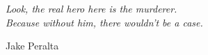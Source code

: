 
\null\vskip5cm%
\begin{flushright}
\it
    Look, the real hero here is the murderer.\\
    Because without him, there wouldn't be a case.
    
    Jake Peralta
\end{flushright}
\vfill\newpage

